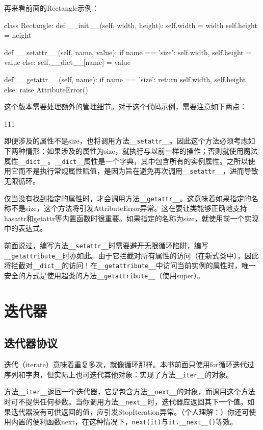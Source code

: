 再来看前面的Rectangle示例：
\begin{pyc}
class Rectangle:
    def __init__(self, width, height):
        self.width = width
        self.height = height

    def __setattr__(self, name, value):
        if name == 'size':
            self.width, self.height = value
        else:
            self.__dict__[name] = value

    def __getattr__(self, name):
        if name == 'size':
            return self.width, self.height
        else:
            raise AttributeError()
\end{pyc}
这个版本需要处理额外的管理细节。对于这个代码示例，需要注意如下两点：
\begin{dinglist}{111}
\item 即便涉及的属性不是size，也将调用方法\verb|__setattr__|。因此这个方法必须考虑如下两种情形：如果涉及的属性为size，就执行与以前一样的操作；否则就使用魔法属性\verb|__dict__|。\verb|__dict__|属性是一个字典，其中包含所有的实例属性。之所以使用它而不是执行常规属性赋值，是因为旨在避免再次调用\verb|__setattr__|，进而导致无限循环。
\item 仅当没有找到指定的属性时，才会调用方法\verb|__getattr__|。这意味着如果指定的名称不是size，这个方法将引发AttributeError异常。这在要让类能够正确地支持hasattr和getattr等内置函数时很重要。如果指定的名称为size，就使用前一个实现中的表达式。
\end{dinglist}
\begin{tcolorbox}
前面说过，编写方法\verb|__setattr__|时需要避开无限循环陷阱，编写\verb|__getattribute__|时亦如此。由于它拦截对所有属性的访问（在新式类中），因此将拦截对\verb|__dict__|的访问！在\verb|__getattribute__|中访问当前实例的属性时，唯一安全的方式是使用超类的方法\verb|__getattribute__|（使用super）。
\end{tcolorbox}
\section{迭代器}
\subsection{迭代器协议}
迭代（iterate）意味着重复多次，就像循环那样。本书前面只使用for循环迭代过序列和字典，但实际上也可迭代其他对象：实现了方法\verb|__iter__|的对象。

方法\verb|__iter__|返回一个迭代器，它是包含方法\verb|__next__|的对象，而调用这个方法时可不提供任何参数。当你调用方法\verb|__next__|时，迭代器应返回其下一个值。如果迭代器没有可供返回的值，应引发StopIteration异常。（个人理解：）你还可使用内置的便利函数next，在这种情况下，\verb|next(it)|与\verb|it.__next__()|等效。

